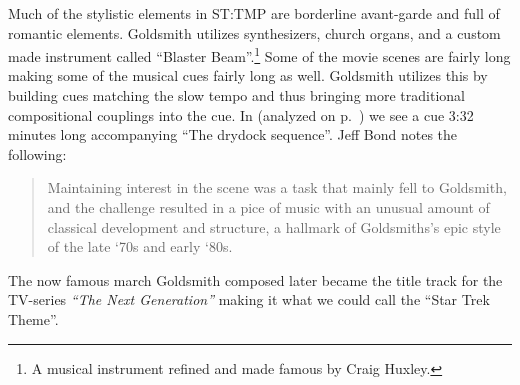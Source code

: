 Much of the stylistic elements in \ac{ST:TMP} are borderline avant-garde and full of romantic elements. Goldsmith utilizes synthesizers, church organs, and a custom made instrument called ``Blaster Beam''.\footnote{
A musical instrument refined and made famous by Craig Huxley.
}
Some of the movie scenes are fairly long making some of the musical cues fairly long as well. Goldsmith utilizes this by building cues matching the slow tempo and thus bringing more traditional compositional couplings into the cue. In  (analyzed on p.~\pageref{sec:leaving drydock}) we see a cue 3:32 minutes long accompanying ``The drydock sequence''. Jeff Bond notes the following: \blockquote[{\cite[88]{bond_music_1998}}]
{
Maintaining interest in the scene was a task that mainly fell to Goldsmith, and the challenge resulted in a pice of music with an unusual amount of classical development and structure, a hallmark of Goldsmiths's epic style of the late `70s and early `80s.
}
The now famous march Goldsmith composed later became the title track for the TV-series \textit{``The Next Generation''} making it what we could call the ``Star Trek Theme''.

